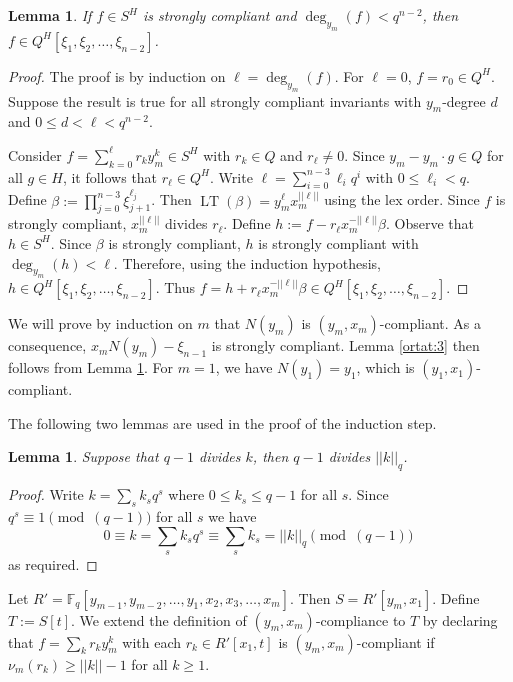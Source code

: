 \documentclass{amsart}
\newcommand{\field}{\mathbb{F}}
\newtheorem{lem}[subsection]{Lemma}
\DeclareMathOperator{\lt}{LT}
\begin{document}
 \begin{lem} \label{orstcomp} If $f\in S^H$ is strongly compliant and $\deg_{y_m}(f)<q^{n-2}$, then $f\in Q^H[\xi_{1},\xi_2,\ldots,\xi_{n-2}]$.
 \end{lem}
  \begin{proof} 
  The proof is by induction on $\ell=\deg_{y_m}(f)$. For $\ell=0$, $f=r_0\in Q^H$.
  Suppose the result is true for all strongly compliant invariants with $y_m$-degree $d$ and $0\leq d<\ell<q^{n-2}$. 
  
  Consider $f=\sum_{k=0}^{\ell}r_k y_m^k \in S^H$ with $r_k\in Q$ and $r_{\ell}\not=0$. 
Since $y_m-y_m\cdot g \in Q$ for all $g \in H$, it follows that $r_{\ell}\in Q^H$. 
  Write $\ell=\sum_{i=0}^{n-3}\ell_iq^i$ with $0\leq \ell_i<q$. Define $\beta:=\prod_{j=0}^{n-3}\xi_{j+1}^{\ell_j}$. 
  Then $\lt(\beta)=y_m^{\ell}x_m^{||\ell||}$ using the lex order.
  Since $f$ is strongly compliant, $x_m^{||\ell||}$ divides $r_{\ell}$. Define $h:=f-r_{\ell}x_m^{-||\ell||}\beta$. Observe that $h\in S^H$.
  Since $\beta$ is strongly compliant, $h$ is strongly compliant with $\deg_{y_m}(h)<\ell$.
  Therefore, using the induction hypothesis, $h\in Q^H[\xi_{1},\xi_2,\ldots,\xi_{n-2}]$. Thus $f=h+r_{\ell}x_m^{-||\ell||}\beta\in Q^H[\xi_{1},\xi_2,\ldots,\xi_{n-2}]$.
   \end{proof}



 We will prove by induction on $m$ that $N(y_m)$ is $(y_m,x_m)$-compliant. As a consequence,  $x_mN(y_m)-\xi_{n-1}$ is strongly compliant.
 Lemma \ref{ortat:3} then follows from Lemma \ref{orstcomp}.
For $m=1$, we have $N(y_1)=y_1$, which is $(y_1,x_1)$-compliant.
 
 The following two lemmas are used in the proof of the induction step.

\begin{lem}\label{divisible by 9}
  Suppose that $q-1$ divides $k$, then $q-1$ divides $||k||_q$.
\end{lem}
\begin{proof}
  Write $k = \sum_s k_s q^s$ where $0 \leq k_s \leq q-1$ for all $s$.
  Since $q^s \equiv 1 \pmod{(q-1)}$ for all $s$ we have
  $$0 \equiv k = \sum_s k_s q^s \equiv \sum_s k_s = ||k||_q \pmod{(q-1)}\ 
  $$ 
  as required.
\end{proof}



Let $R'=\field_q[y_{m-1},y_{m-2},\dots,y_1,x_2,x_3,\dots,x_m]$.  Then
$S=R'[y_m,x_1]$.
Define $T:=S[t]$.   We extend the definition of $(y_m,x_m)$-compliance to $T$ by declaring that
$f=\sum_k r_k y_m^k$ with each
$r_k \in R'[x_1,t]$ is $(y_m,x_m)$-compliant
if $\nu_m(r_k) \geq ||k||-1$ for all $k \geq 1$.
\end{document}
